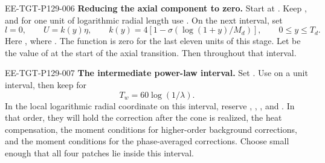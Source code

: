 \begin{EESegment}{EE-TGT-P129-006}
\noindent\textbf{Reducing the axial component to zero.} Start at
. Keep , and for one unit of
logarithmic radial length use . On the next
interval, set
\[
l=0,
\qquad U=k(y)\eta,
\qquad k(y)=4[1-\sigma(\log(1+y)/M_d)],
\qquad 0\le y\le T_d.
\]
Here , where
. The function
 is zero for the last eleven units of this stage. Let
 be the value of
 at the start of the axial transition. Then
 throughout that interval.
\end{EESegment}

\begin{EESegment}{EE-TGT-P129-007}
\noindent\textbf{The intermediate power-law interval.} Set
. Use  on a unit
interval, then keep  for
\begin{equation}
T_w=60\log(1/\lambda).
\tag{A.9}\label{eq:A.9}
\end{equation}
In the local logarithmic radial coordinate on this interval, reserve
,
,
, and
. In that order, they will hold the correction after
the cone is realized, the heat compensation, the moment conditions for higher-order
background corrections, and the moment conditions for the phase-averaged corrections.
Choose  small enough that all four patches lie inside this
interval.
\end{EESegment}

